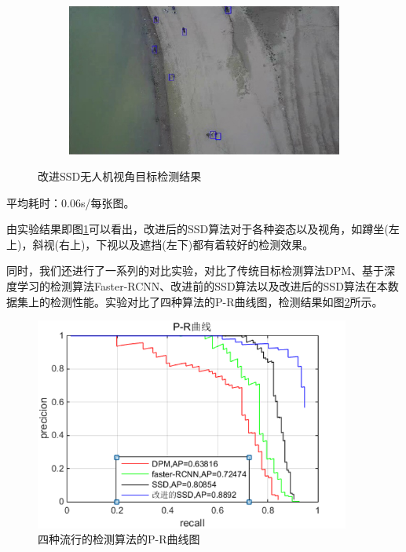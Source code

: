 \begin{figure}[h]
\begin{subfigure}[h]{0.42\textwidth}
    \end{subfigure}
    ~
    \begin{subfigure}[h]{0.42\textwidth}
        \includegraphics[width=\textwidth]{figures/改进SSD无人机视角目标检测结果4.jpg}   
    \end{subfigure}

    \caption{改进SSD无人机视角目标检测结果}\label{改进SSD无人机视角目标检测结果}
\end{figure}


平均耗时：0.06s/每张图。

由实验结果即图\ref{改进SSD无人机视角目标检测结果}可以看出，改进后的SSD算法对于各种姿态以及视角，如蹲坐(左上)，斜视(右上)，下视以及遮挡(左下)都有着较好的检测效果。

同时，我们还进行了一系列的对比实验，对比了传统目标检测算法DPM、基于深度学习的检测算法Faster-RCNN、改进前的SSD算法以及改进后的SSD算法在本数据集上的检测性能。实验对比了四种算法的P-R曲线图，检测结果如图\ref{PR}所示。
\begin{figure}[h]
    \centering
    \includegraphics[height=7cm]{figures/PR曲线.png}
    \caption{四种流行的检测算法的P-R曲线图}\label{PR}
\end{figure}

